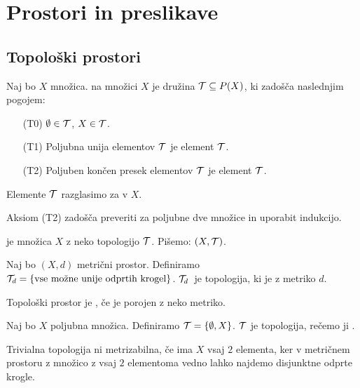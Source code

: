 \section{Prostori in preslikave}
\subsection{Topološki prostori}
\begin{definicija}
    Naj bo $X$ množica.  na množici $X$ je družina $\mathcal{T} \subseteq P(X)$, ki zadošča naslednjim pogojem:
    \begin{enumerate}
        \item[(T0)] $\emptyset \in \mathcal{T}$, $X \in \mathcal{T}$.
        \item[(T1)] Poljubna unija elementov $\mathcal{T}$ je element $\mathcal{T}$.
        \item[(T2)] Poljuben končen presek elementov $\mathcal{T}$ je element $\mathcal{T}$.
    \end{enumerate}
    Elemente $\mathcal{T}$ razglasimo za  v $X$.
\end{definicija}

\begin{opomba}
    Aksiom (T2) zadošča preveriti za poljubne dve množice in uporabit indukcijo.
\end{opomba}

\begin{definicija}
     je množica $X$ z neko topologijo $\mathcal{T}$. Pišemo: $(X, \mathcal{T})$.
\end{definicija}

\begin{primer}
    Naj bo $(X, d)$ metrični prostor. Definiramo $\mathcal{T}_d = \left\{\text{vse možne unije odprtih krogel}\right\}$. $\mathcal{T}_d$~je topologija, ki je  z metriko $d$.
\end{primer}

\begin{definicija}
    Topološki prostor je , če je porojen z neko metriko.
\end{definicija}

\begin{primer}
    Naj bo $X$ poljubna množica. Definiramo $\mathcal{T} = \left\{\emptyset, X\right\}$. $\mathcal{T}$ je topologija, rečemo ji .

    Trivialna topologija ni metrizabilna, če ima $X$ vsaj $2$ elementa, ker v metričnem prostoru z množico z vsaj $2$ elementoma vedno lahko najdemo disjunktne odprte krogle.
\end{primer}

